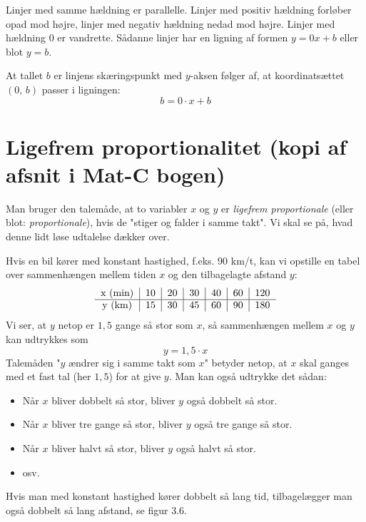 \documentclass[12pt,oneside,a4paper]{article}
\begin{document}
Linjer med samme hældning er parallelle. Linjer med positiv hældning forløber
opad mod højre, linjer med negativ hældning nedad mod højre. Linjer med
hældning 0 er vandrette.  Sådanne linjer har en ligning af formen $y=0x+b$
eller blot $y=b$.

At tallet $b$ er linjens skæringspunkt med $y$-aksen følger af, at
koordinatsættet $(0,\,b)$ passer i ligningen:
$$
b = 0\cdot x+b
$$

\section{Ligefrem proportionalitet (kopi af afsnit i Mat-C bogen)}
Man bruger den talemåde, at to variabler $x$ og $y$ er {\em ligefrem
proportionale} (eller blot: {\em proportionale}), hvis de "stiger og falder i
samme takt". Vi skal se på, hvad denne lidt løse udtalelse dækker over.

Hvis en bil kører med konstant hastighed, f.eks. 90 km/t, kan vi opstille en
tabel over sammenhængen mellem tiden $x$ og den tilbagelagte afstand $y$:
$$
\begin{tabular}{c|c|c|c|c|c|c}
    x ({\rm min}) & 10 & 20 & 30 & 40 & 60 & 120 \\
    \hline
    y ({\rm km})  & 15 & 30 & 45 & 60 & 90 & 180  
\end{tabular}
$$
Vi ser, at $y$ netop er $1,5$ gange så stor som $x$, så sammenhængen mellem $x$
og $y$ kan udtrykkes som
$$
y = 1,5\cdot x
$$
Talemåden "$y$ ændrer sig i samme takt som $x$" betyder netop, at $x$ skal
ganges med et fast tal (her $1,5$) for at give $y$. Man kan også udtrykke det
sådan:
\begin{itemize}
    \item Når $x$ bliver dobbelt så stor, bliver $y$ også dobbelt så stor.
    \item Når $x$ bliver tre gange så stor, bliver $y$ også tre gange så stor.
    \item Når $x$ bliver halvt så stor, bliver $y$ også halvt så stor.
    \item osv.
\end{itemize}
Hvis man med konstant hastighed kører dobbelt så lang tid, tilbagelægger man
også dobbelt så lang afstand, se figur 3.6.
\end{document}
